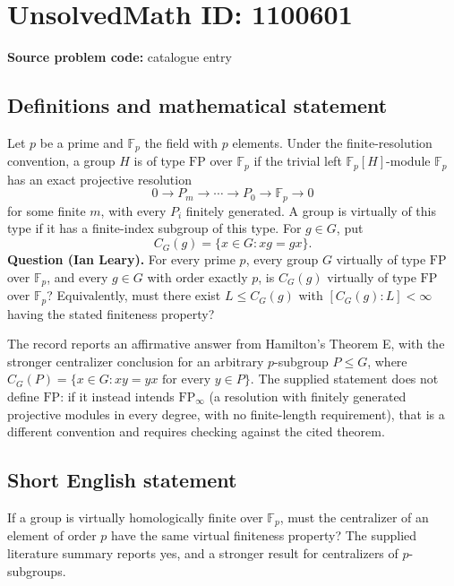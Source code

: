 \documentclass[11pt]{article}
\begin{document}
\section*{UnsolvedMath ID: 1100601}
\textbf{Source problem code:} catalogue entry
\subsection{Definitions and mathematical statement}
Let $p$ be a prime and $\mathbb F_p$ the field with $p$ elements. Under the finite-resolution convention, a group $H$ is of type $\mathrm{FP}$ over $\mathbb F_p$ if the trivial left $\mathbb F_p[H]$-module $\mathbb F_p$ has an exact projective resolution
\[
0\longrightarrow P_m\longrightarrow\cdots\longrightarrow P_0\longrightarrow\mathbb F_p\longrightarrow0
\]
for some finite $m$, with every $P_i$ finitely generated. A group is virtually of this type if it has a finite-index subgroup of this type. For $g\in G$, put
\[
C_G(g)=\{x\in G:xg=gx\}.
\]
\textbf{Question (Ian Leary).} For every prime $p$, every group $G$ virtually of type $\mathrm{FP}$ over $\mathbb F_p$, and every $g\in G$ with order exactly $p$, is $C_G(g)$ virtually of type $\mathrm{FP}$ over $\mathbb F_p$? Equivalently, must there exist $L\leq C_G(g)$ with $[C_G(g):L]<\infty$ having the stated finiteness property?

The record reports an affirmative answer from Hamilton's Theorem E, with the stronger centralizer conclusion for an arbitrary $p$-subgroup $P\leq G$, where $C_G(P)=\{x\in G:xy=yx\text{ for every }y\in P\}$. The supplied statement does not define $\mathrm{FP}$: if it instead intends $\mathrm{FP}_{\infty}$ (a resolution with finitely generated projective modules in every degree, with no finite-length requirement), that is a different convention and requires checking against the cited theorem.
\subsection{Short English statement}
If a group is virtually homologically finite over $\mathbb F_p$, must the centralizer of an element of order $p$ have the same virtual finiteness property? The supplied literature summary reports yes, and a stronger result for centralizers of $p$-subgroups.
\end{document}
